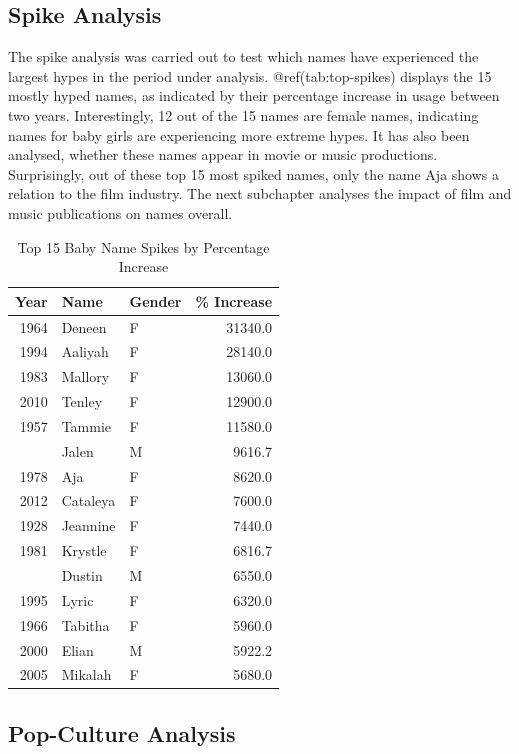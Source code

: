 \documentclass[11pt,preprint]{elsarticle}
\numberwithin{equation}{section}
\numberwithin{figure}{section}
\numberwithin{table}{section}
\begin{document}
\subsection{Spike Analysis}\label{spike-analysis}

The spike analysis was carried out to test which names have experienced
the largest hypes in the period under analysis. @ref(tab:top-spikes)
displays the 15 mostly hyped names, as indicated by their percentage
increase in usage between two years. Interestingly, 12 out of the 15
names are female names, indicating names for baby girls are experiencing
more extreme hypes. It has also been analysed, whether these names
appear in movie or music productions. Surprisingly, out of these top 15
most spiked names, only the name Aja shows a relation to the film
industry. The next subchapter analyses the impact of film and music
publications on names overall.

\begin{longtable}[t]{rllr}
\caption{\label{tab:top-spikes}Top 15 Baby Name Spikes by Percentage Increase}\\
\toprule
Year & Name & Gender & \% Increase\\
\midrule
1964 & Deneen & F & 31340.0\\
1994 & Aaliyah & F & 28140.0\\
1983 & Mallory & F & 13060.0\\
2010 & Tenley & F & 12900.0\\
1957 & Tammie & F & 11580.0\\
\addlinespace
1992 & Jalen & M & 9616.7\\
1978 & Aja & F & 8620.0\\
2012 & Cataleya & F & 7600.0\\
1928 & Jeannine & F & 7440.0\\
1981 & Krystle & F & 6816.7\\
\addlinespace
1968 & Dustin & M & 6550.0\\
1995 & Lyric & F & 6320.0\\
1966 & Tabitha & F & 5960.0\\
2000 & Elian & M & 5922.2\\
2005 & Mikalah & F & 5680.0\\
\bottomrule
\end{longtable}

\subsection{Pop-Culture Analysis}\label{pop-culture-analysis}
\end{document}
